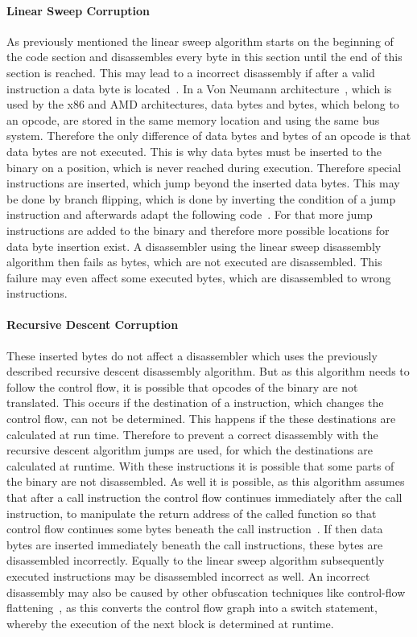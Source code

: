\documentclass[10pt,twoside,a4paper,bibliography=totoc]{scrbook}
\begin{document}
\paragraph*{Linear Sweep Corruption}
As previously mentioned the linear sweep algorithm starts on the beginning of the
code section and disassembles every byte in this section until the end of this 
section is reached.
This may lead to a incorrect disassembly if after a valid
instruction a data byte is located~\cite{obfubo}.
In a Von Neumann architecture~\cite{neumann}, which is used by the x86 and AMD architectures,
data bytes and bytes, which belong to an opcode, are stored in the same
memory location and using the same bus system.
Therefore the only difference of data bytes and bytes of an opcode is that data 
bytes are not executed.
This is why data bytes must be inserted to the binary on a position, which is never 
reached during execution.
Therefore special instructions are inserted, which jump beyond the inserted data bytes.
This may be done by branch flipping, which is done by inverting the condition 
of a jump instruction and afterwards adapt the following code~\cite{obfsurvy}.
For that more jump instructions are added to the binary and therefore more 
possible locations for data byte insertion exist.
A disassembler using the linear sweep disassembly algorithm then fails as bytes, which are 
not executed are disassembled.
This failure may even affect some executed bytes, which are disassembled to 
wrong instructions. 

\paragraph*{Recursive Descent Corruption}
These inserted bytes do not affect a disassembler which uses the previously 
described recursive descent disassembly algorithm.
But as this algorithm needs to follow the control flow, it is possible that opcodes
of the binary are not translated.
This occurs if the destination of a instruction, which changes the control flow, can not be determined.
This happens if the these destinations are calculated at run time.
Therefore to prevent a correct disassembly with the recursive descent algorithm jumps are used,
for which the destinations are calculated at runtime.
With these instructions it is possible that some parts of the binary are not
disassembled.
As well it is possible, as this algorithm assumes that after a call instruction
the control flow continues immediately after the call instruction, to manipulate the 
return address of the called function so that control flow continues some bytes 
beneath the call instruction~\cite{obfsurvy}.
If then data bytes are inserted immediately beneath the call instructions,
these bytes are disassembled incorrectly.
Equally to the linear sweep algorithm subsequently executed instructions may 
be disassembled incorrect as well.
An incorrect disassembly may also be caused by other obfuscation techniques like 
control-flow flattening~\cite{obfubo}, as this converts the control flow graph 
into a switch statement, whereby the execution of the next block is determined 
at runtime.
\end{document}
